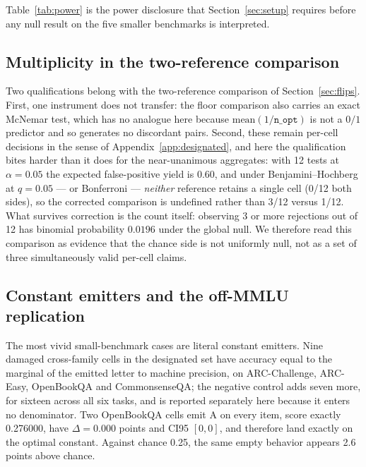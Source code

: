 Table~\ref{tab:power} is the power disclosure that Section~\ref{sec:setup} requires before any null result on the five smaller benchmarks is interpreted.



\FloatBarrier

\subsection{Multiplicity in the two-reference comparison}
\label{app:analysis-mult}

Two qualifications belong with the two-reference comparison of Section~\ref{sec:flips}. First, one instrument does not transfer: the floor comparison also carries an exact McNemar test, which has no analogue here because $\mathrm{mean}(1/\texttt{n\_opt})$ is not a $0/1$ predictor and so generates no discordant pairs. Second, these remain per-cell decisions in the sense of Appendix~\ref{app:designated}, and here the qualification bites harder than it does for the near-unanimous aggregates: with 12 tests at $\alpha=0.05$ the expected false-positive yield is $0.60$, and under Benjamini--Hochberg at $q=0.05$ --- or Bonferroni --- \emph{neither} reference retains a single cell (0/12 both sides), so the corrected comparison is undefined rather than 3/12 versus 1/12. What survives correction is the count itself: observing 3 or more rejections out of 12 has binomial probability $0.0196$ under the global null. We therefore read this comparison as evidence that the chance side is not uniformly null, not as a set of three simultaneously valid per-cell claims.

\subsection{Constant emitters and the off-MMLU replication}
\label{app:offmmlu}

The most vivid small-benchmark cases are literal constant emitters. Nine damaged cross-family cells in the designated set have accuracy equal to the marginal of the emitted letter to machine precision, on ARC-Challenge, ARC-Easy, OpenBookQA and CommonsenseQA; the negative control adds seven more, for sixteen across all six tasks, and is reported separately here because it enters no denominator. Two OpenBookQA cells emit A on every item, score exactly 0.276000, have $\Delta=0.000$ points and CI95 $[0,0]$, and therefore land exactly on the optimal constant. Against chance 0.25, the same empty behavior appears 2.6 points above chance.

